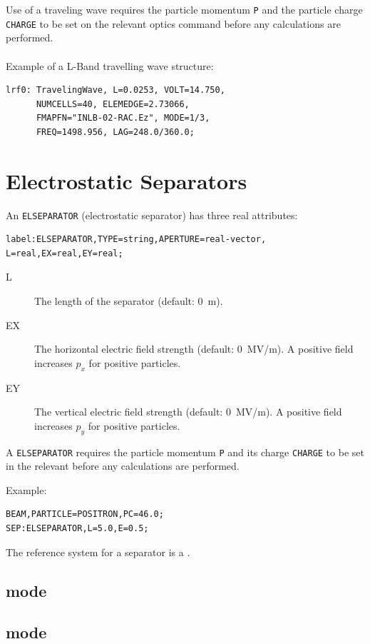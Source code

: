 \noindent Use of a traveling wave requires the particle momentum \texttt{P}
and the particle charge \texttt{CHARGE} to be set on the relevant 
optics command before any calculations are performed.
\\\\
\noindent Example of a L-Band travelling wave structure:
\begin{verbatim}
lrf0: TravelingWave, L=0.0253, VOLT=14.750,
      NUMCELLS=40, ELEMEDGE=2.73066,
      FMAPFN="INLB-02-RAC.Ez", MODE=1/3,
      FREQ=1498.956, LAG=248.0/360.0;
\end{verbatim}

\section{Electrostatic Separators}
\label{sec:separator}
An \texttt{ELSEPARATOR} (electrostatic separator) has three real
attributes:
\begin{verbatim}
label:ELSEPARATOR,TYPE=string,APERTURE=real-vector,
L=real,EX=real,EY=real;
\end{verbatim}
\begin{description}
\item[L]
  The length of the separator (default: 0~m).
\item[EX]
  The horizontal electric field strength (default: 0~MV/m).
  A positive field increases $p_x$ for positive particles.
\item[EY]
  The vertical electric field strength (default: 0~MV/m).
  A positive field increases $p_y$ for positive particles.
\end{description}
A \texttt{ELSEPARATOR} requires the particle momentum \texttt{P} 
and its charge \texttt{CHARGE} to be set in the relevant
 before any calculations are performed.

\noindent Example:
\begin{verbatim}
BEAM,PARTICLE=POSITRON,PC=46.0;
SEP:ELSEPARATOR,L=5.0,E=0.5;
\end{verbatim}
The reference system for a separator is a 
.
\subsection{\opalt mode}

\subsection{\opalcycl mode}

